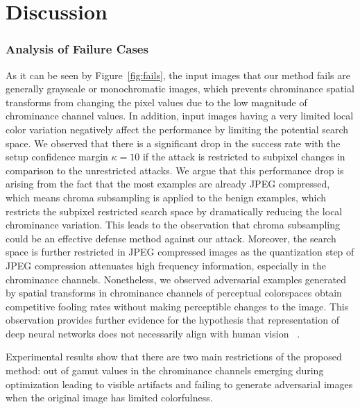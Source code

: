 \chapter{Discussion}
\label{chp:5_discussion}

\subsection*{Analysis of Failure Cases}

As it can be seen by Figure~\ref{fig:fails}, the input images that our method fails are generally grayscale or monochromatic images, which prevents chrominance spatial transforms from changing the pixel values due to the low magnitude of chrominance channel values. In addition, input images having a very limited local color variation negatively affect the performance by limiting the potential search space. We observed that there is a significant drop in the success rate with the setup confidence margin \(\kappa=10\) if the attack is restricted to subpixel changes in comparison to the unrestricted attacks. We argue that this performance drop is arising from the fact that the most examples are already JPEG compressed, which means chroma subsampling is applied to the benign examples, which restricts the subpixel restricted search space by dramatically reducing the local chrominance variation. This leads to the observation that chroma subsampling could be an effective defense method against our attack. Moreover, the search space is further restricted in JPEG compressed images as the quantization step of JPEG compression attenuates high frequency information, especially in the chrominance channels. Nonetheless, we observed adversarial examples generated by spatial transforms in chrominance channels of perceptual colorspaces obtain competitive fooling rates without making perceptible changes to the image. This observation provides further evidence for the hypothesis that representation of deep neural networks does not necessarily align with human vision ~\cite{geirhos2018imagenet}.

Experimental results show that there are two main restrictions of the proposed method: out of gamut values in the chrominance channels emerging during optimization leading to visible artifacts and failing to generate adversarial images when the original image has limited colorfulness.

